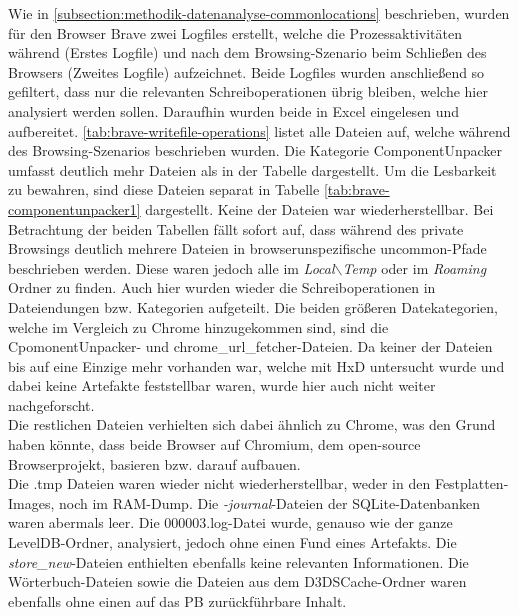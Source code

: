 \begin{appendices}
Wie in \ref{subsection:methodik-datenanalyse-commonlocations} beschrieben, wurden für den Browser Brave zwei Logfiles erstellt, welche die Prozessaktivitäten während (Erstes Logfile) und nach dem Browsing-Szenario beim Schließen des Browsers (Zweites Logfile) aufzeichnet. Beide Logfiles wurden anschließend so gefiltert, dass nur die relevanten Schreiboperationen übrig bleiben, welche hier analysiert werden sollen. Daraufhin wurden beide in Excel eingelesen und aufbereitet. \autoref{tab:brave-writefile-operations} listet alle Dateien auf, welche während des Browsing-Szenarios beschrieben wurden. Die Kategorie \glqq{}ComponentUnpacker\grqq{} umfasst deutlich mehr Dateien als in der Tabelle dargestellt. Um die Lesbarkeit zu bewahren, sind diese Dateien separat in Tabelle \ref{tab:brave-componentunpacker1} dargestellt. Keine der Dateien war wiederherstellbar.
Bei Betrachtung der beiden Tabellen fällt sofort auf, dass während des private Browsings deutlich mehrere Dateien in browserunspezifische \glqq{}uncommon\grqq{}-Pfade beschrieben werden. Diese waren jedoch alle im \textit{Local$\backslash$Temp} oder im \textit{Roaming} Ordner zu finden. Auch hier wurden wieder die Schreiboperationen in Dateiendungen bzw. Kategorien aufgeteilt. Die beiden größeren Datekategorien, welche im Vergleich zu Chrome hinzugekommen sind, sind die \glqq{}CpomonentUnpacker\grqq{}- und \glqq{}chrome\_url\_fetcher\grqq{}-Dateien. Da keiner der Dateien bis auf eine Einzige mehr vorhanden war, welche mit HxD untersucht wurde und dabei keine Artefakte feststellbar waren, wurde hier auch nicht weiter nachgeforscht. \\
Die restlichen Dateien verhielten sich dabei ähnlich zu Chrome, was den Grund haben könnte, dass beide Browser auf Chromium, dem open-source Browserprojekt, basieren bzw. darauf aufbauen. \\
Die .tmp Dateien waren wieder nicht wiederherstellbar, weder in den Festplatten-Images, noch im RAM-Dump. Die \textit{-journal}-Dateien der SQLite-Datenbanken waren abermals leer. Die 000003.log-Datei wurde, genauso wie der ganze LevelDB-Ordner, analysiert, jedoch ohne einen Fund eines Artefakts. Die \textit{store\_new}-Dateien enthielten ebenfalls keine relevanten Informationen. Die Wörterbuch-Dateien sowie die Dateien aus dem \glqq{}D3DSCache\grqq{}-Ordner waren ebenfalls ohne einen auf das PB zurückführbare Inhalt.


\end{appendices}
